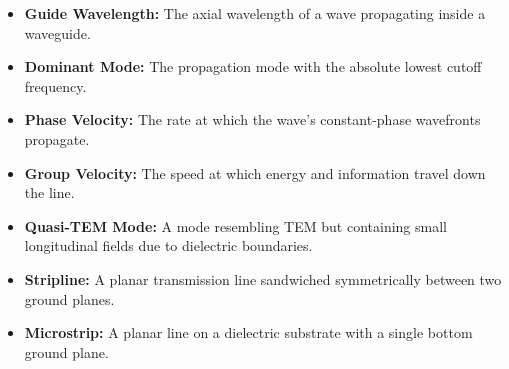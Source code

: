 \documentclass[12pt,a4paper]{article}
\begin{document}
\begin{tcolorbox}[defbox, title={\textbf{One-Line Definitions}}]
\begin{itemize}[leftmargin=*, itemsep=2.5pt, topsep=0pt]
  \item \textbf{Guide Wavelength:} The axial wavelength of a wave propagating inside a waveguide.
  \item \textbf{Dominant Mode:} The propagation mode with the absolute lowest cutoff frequency.
  \item \textbf{Phase Velocity:} The rate at which the wave's constant-phase wavefronts propagate.
  \item \textbf{Group Velocity:} The speed at which energy and information travel down the line.
  \item \textbf{Quasi-TEM Mode:} A mode resembling TEM but containing small longitudinal fields due to dielectric boundaries.
  \item \textbf{Stripline:} A planar transmission line sandwiched symmetrically between two ground planes.
  \item \textbf{Microstrip:} A planar line on a dielectric substrate with a single bottom ground plane.
\end{itemize}
\end{tcolorbox}
\end{document}
